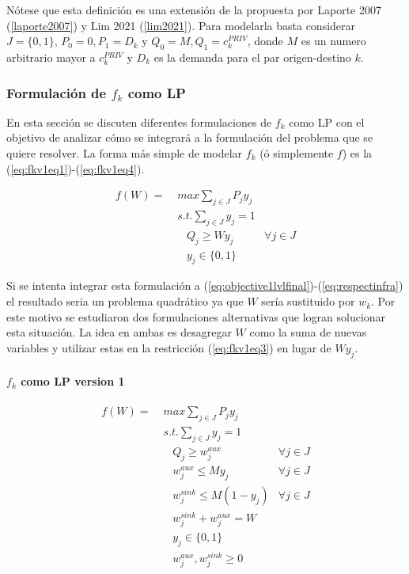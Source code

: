 \documentclass{article}
\begin{document}
  Nótese que esta definición es una extensión de la propuesta por Laporte 2007 (\ref{laporte2007}) y Lim 2021 (\ref{lim2021}). Para modelarla basta considerar $J = \{0, 1\}$, $P_0 = 0, P_1 = D_k$ y $Q_0 = M, Q_1 = c^{PRIV}_k$, donde $M$ es un numero arbitrario mayor a $c^{PRIV}_k$ y $D_k$ es la demanda para el par origen-destino $k$.

  \subsubsection*{Formulación de $f_k$ como LP}

  En esta sección se discuten diferentes formulaciones de $f_k$ como LP con el objetivo de analizar cómo se integrará a la formulación del problema que se quiere resolver. La forma más simple de modelar $f_k$ (ó simplemente $f$) es la (\ref{eq:fkv1eq1})-(\ref{eq:fkv1eq4}).

  \begin{align}
    f(W) =\; & max \sum_{j \in J} P_j y_j    & \label{eq:fkv1eq1}\\
             & s.t. \sum_{j \in J} y_j = 1   & \label{eq:fkv1eq2} \\
             & \;\;\; Q_j \geq W y_j         & \label{eq:fkv1eq3} \forall j \in J \\
             & \;\;\; y_j \in \{0,1\}        & \label{eq:fkv1eq4}
  \end{align}

  Si se intenta integrar esta formulación a (\ref{eq:objective1lvlfinal})-(\ref{eq:respectinfra}) el resultado seria un problema quadrático ya que $W$ sería sustituido por $w_k$. Por este motivo se estudiaron dos formulaciones alternativas que logran solucionar esta situación. La idea en ambas es desagregar $W$ como la suma de nuevas variables y utilizar estas en la restricción (\ref{eq:fkv1eq3}) en lugar de $W y_j$.

  \paragraph*{$f_k$ como LP version 1}

  \begin{align}
    f(W) =\; & max \sum_{j \in J} P_j y_j             & \label{eq:fkv3eq1}\\
             & s.t. \sum_{j \in J} y_j = 1            & \label{eq:fkv3eq2}\\
             & \;\;\; Q_j \geq w^{aux}_j              & \forall j \in J \label{eq:fkv3eq3} \\
             & \;\;\; w^{aux}_j \leq M y_j            & \forall j \in J \label{eq:fkv3eq4} \\
             & \;\;\; w^{sink}_j \leq M (1 - y_j)     & \forall j \in J \label{eq:fkv3eq5} \\
             & \;\;\; w^{sink}_j + w^{aux}_j = W      & \label{eq:fkv3eq6} \\
             & \;\;\; y_j \in \{0,1\}                 & \label{eq:fkv3domainy} \\
             & \;\;\; w^{aux}_j, w^{sink}_j \geq 0    & \label{eq:fkv3eq7}
  \end{align}
\end{document}
